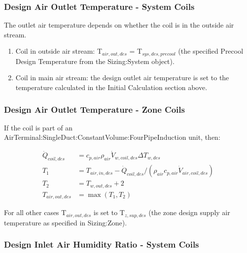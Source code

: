\subsubsection{Design Air Outlet Temperature - System Coils}\label{design-air-outlet-temperature---system-coils}

The outlet air temperature depends on whether the coil is in the outside air stream.

\begin{enumerate}
\def\labelenumi{\arabic{enumi}.}
\item
  Coil in outside air stream: T\(_{air,out,des}\) = T\(_{sys,des,precool}\) (the specified Precool Design Temperature from the Sizing:System object).
\item
  Coil in main air stream: the design outlet air temperature is set to the temperature calculated in the Initial Calculation section above.
\end{enumerate}

\subsubsection{Design Air Outlet Temperature - Zone Coils}\label{design-air-outlet-temperature---zone-coils}

If the coil is part of an AirTerminal:SingleDuct:ConstantVolume:FourPipeInduction unit, then:

\begin{equation}
 \begin{array}{rl}
  \dot{Q}_{coil,des} & = c_{p,air}\rho_{air}\dot{V}_{w,coil,des}\Delta T_{w,des} \\
  T_1 & = T_{air,in,des} - \dot{Q}_{coil,des} / \left(\rho_{air}c_{p,air}\dot V_{air,coil,des}\right) \\
  T_2 & = T_{w,out,des} + 2 \\
  T_{air,out,des} & = \max \left(T_1,T_2\right)
 \end{array}
\end{equation}

For all other cases T\(_{air,out,des}\) is set to T\(_{z,sup,des}\) (the zone design supply air temperature as specified in Sizing:Zone).

\subsubsection{Design Inlet Air Humidity Ratio - System Coils}\label{design-inlet-air-humidity-ratio---system-coils}

